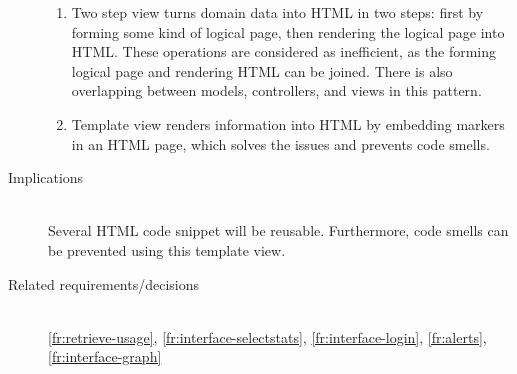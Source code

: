 \begin{description}
\begin{enumerate}
\item Two step view turns domain data into HTML in two steps: first by forming some kind of logical page, then rendering the logical page into HTML. These operations are considered as inefficient, as the forming logical page and rendering HTML can be joined. There is also overlapping between models, controllers, and views in this pattern.

\item Template view renders information into HTML by embedding markers in an HTML page, which solves the issues and prevents code smells.
\end{enumerate}

\item [Implications]~\\
Several HTML code snippet will be reusable. Furthermore, code smells can be prevented using this template view.

\item [Related requirements/decisions]~\\
\ref{fr:retrieve-usage}, \ref{fr:interface-selectstats}, \ref{fr:interface-login}, \ref{fr:alerts}, \ref{fr:interface-graph}

\end{description}
